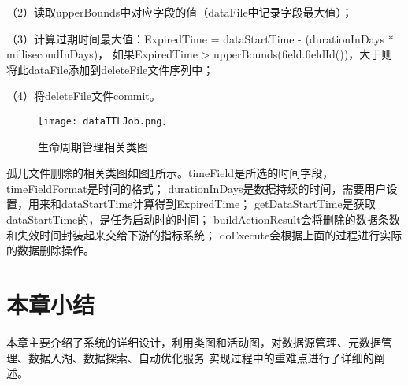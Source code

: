 （2）读取upperBounds中对应字段的值（dataFile中记录字段最大值）；

（3）计算过期时间最大值：ExpiredTime = dataStartTime - (durationInDays * millisecondInDays)，
如果ExpiredTime > upperBounds(field.fieldId())，大于则将此dataFile添加到deleteFile文件序列中；

（4）将deleteFile文件commit。

\begin{figure}[H]
  \centering
  \texttt{[image: dataTTLJob.png]}
  \caption{生命周期管理相关类图}
  \label{fig:dataTTLJob}
\end{figure}

孤儿文件删除的相关类图如图\ref{fig:dataTTLJob}所示。timeField是所选的时间字段，timeFieldFormat是时间的格式；
durationInDays是数据持续的时间，需要用户设置，用来和dataStartTime计算得到ExpiredTime；
getDataStartTime是获取dataStartTime的，是任务启动时的时间；
buildActionResult会将删除的数据条数和失效时间封装起来交给下游的指标系统；
doExecute会根据上面的过程进行实际的数据删除操作。

\section{本章小结}

本章主要介绍了系统的详细设计，利用类图和活动图，对数据源管理、元数据管理、数据入湖、数据探索、自动优化服务
实现过程中的重难点进行了详细的阐述。
